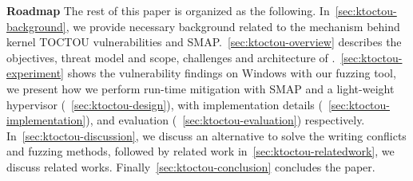 \textbf{Roadmap}
The rest of this paper is organized as the following. 
In~\autoref{sec:ktoctou-background}, we provide necessary background related to the mechanism behind kernel TOCTOU vulnerabilities and SMAP.~\autoref{sec:ktoctou-overview} describes the objectives, threat model and scope, challenges and architecture of \name.~\autoref{sec:ktoctou-experiment} shows the vulnerability findings on Windows with our fuzzing tool, we present how we perform run-time mitigation with SMAP and a light-weight hypervisor (~\autoref{sec:ktoctou-design}), with implementation details (~\autoref{sec:ktoctou-implementation}), and evaluation (~\autoref{sec:ktoctou-evaluation}) respectively.  In~\autoref{sec:ktoctou-discussion}, we discuss an alternative to solve the writing conflicts and fuzzing methods, followed by related work in~\autoref{sec:ktoctou-relatedwork}, we discuss related works. Finally~\autoref{sec:ktoctou-conclusion} concludes the paper.
